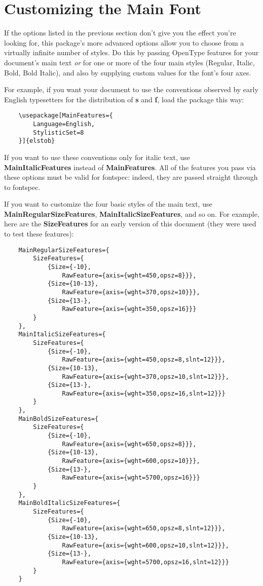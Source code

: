 \documentclass[12pt]{article}
\newcommand{\fspec}{{\sffamily fontspec}}
\begin{document}
\section{Customizing the Main Font}

If the options listed in the previous section don't give you the effect you're looking for,
this package's more advanced options allow you to choose
from a virtually infinite number of styles. Do this by passing OpenType features 
for your document's main text \emph{or} for one or more of the four main styles
(Regular, Italic, Bold, Bold Italic), and also by supplying custom values for the
font's four axes.

For example, if you want your document to use the conventions observed by early
English typesetters for the distribution of \textbf{s} and \textbf{ſ}, load the
package this way:

\footnotesize
\begin{verbatim}
    \usepackage[MainFeatures={
        Language=English,
        StylisticSet=8
    }]{elstob}
\end{verbatim}
\normalsize

\noindent If you want to use these conventions only for italic text, use
\textbf{MainItalicFeatures} instead of \textbf{MainFeatures}. All of the
features you pass via these options must be valid for \fspec: indeed,
they are passed straight through to \fspec.

If you want to customize the four basic styles of the main text, use
\textbf{MainRegularSizeFeatures}, \textbf{MainItalicSizeFeatures}, and so on.
For example, here are the \textbf{SizeFeatures} for an early version of
this document (they were used to test these features):

\footnotesize
\begin{verbatim}
    MainRegularSizeFeatures={
        SizeFeatures={
            {Size={-10},
                RawFeature={axis={wght=450,opsz=8}}},
            {Size={10-13},
                RawFeature={axis={wght=370,opsz=10}}},
            {Size={13-},
                RawFeature={axis={wght=350,opsz=16}}}
        }
    },
    MainItalicSizeFeatures={
        SizeFeatures={
            {Size={-10},
                RawFeature={axis={wght=450,opsz=8,slnt=12}}},
            {Size={10-13},
                RawFeature={axis={wght=370,opsz=10,slnt=12}}},
            {Size={13-},
                RawFeature={axis={wght=350,opsz=16,slnt=12}}}
        }
    },
    MainBoldSizeFeatures={
        SizeFeatures={
            {Size={-10},
                RawFeature={axis={wght=650,opsz=8}}},
            {Size={10-13},
                RawFeature={axis={wght=600,opsz=10}}},
            {Size={13-},
                RawFeature={axis={wght=5700,opsz=16}}}
        }
    },
    MainBoldItalicSizeFeatures={
        SizeFeatures={
            {Size={-10},
                RawFeature={axis={wght=650,opsz=8,slnt=12}}},
            {Size={10-13},
                RawFeature={axis={wght=600,opsz=10,slnt=12}}},
            {Size={13-},
                RawFeature={axis={wght=5700,opsz=16,slnt=12}}}
        }
    }
\end{verbatim}\normalsize
\end{document}
